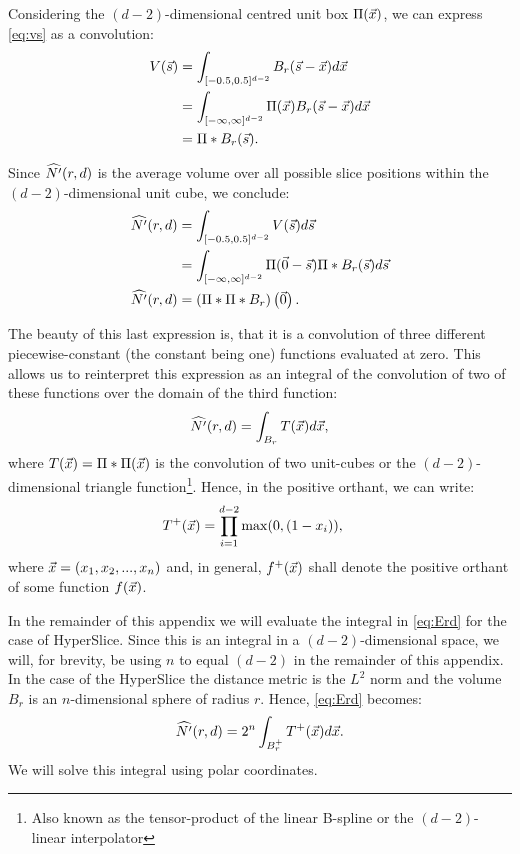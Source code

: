 Considering the $(d-2)$-dimensional centred unit box $\Pi(\vec{x})$, we can express \autoref{eq:vs} as a convolution:
\begin{align*}
  V(\vec{s}) &= \int_{[-0.5,0.5]^{d-2}} B_r(\vec{s}-\vec{x}) d\vec{x}\\
          &= \int_{[-\infty,\infty]^{d-2}} \Pi(\vec{x}) B_r(\vec{s}-\vec{x}) d\vec{x} \\
          &= \Pi * B_r(\vec{s}) \text{.}
\end{align*}

Since $\widehat{N'}(r, d)$ is the average volume over all possible slice positions within the $(d-2)$-dimensional unit cube, we conclude:
\begin{align*}
  \widehat{N'}(r, d) &= \int_{[-0.5,0.5]^{d-2}} V(\vec{s}) d\vec{s} \\
  	&= \int_{[-\infty,\infty]^{d-2}} \Pi(\vec{0}-\vec{s}) \Pi * B_r(\vec{s}) d\vec{s} \\
  \widehat{N'}(r, d) &= \left( \Pi * \Pi * B_r \right) \left(\vec{0}\right) \text{.}
\end{align*}

The beauty of this last expression is, that it is a convolution of three different piecewise-constant (the constant being one) functions evaluated at zero. This allows us to reinterpret this expression as an integral of the convolution of two of these functions over the domain of the third function:
\begin{equation}
  \widehat{N'}(r, d) = \int_{B_r} T(\vec{x}) d\vec{x} \text{,}
  \label{eq:Erd}
\end{equation}
where $T(\vec{x}) = \Pi * \Pi (\vec{x})$ is the convolution of two unit-cubes or the $(d-2)$-dimensional triangle function\footnote{Also known as the tensor-product of the linear B-spline or the $(d-2)$-linear interpolator}. Hence, in the positive orthant, we can write:
\begin{align*}
  T^{+}(\vec{x}) &= \prod_{i=1}^{d-2} \max(0,(1-x_i)) \text{,}
\end{align*}
where $\vec{x} = (x_1, x_2, ..., x_n)$ and, in general, $f^{+}(\vec{x})$ shall denote the positive orthant of some function $f(\vec{x})$.


In the remainder of this appendix we will evaluate the integral in \autoref{eq:Erd} for the case of HyperSlice. Since this is an integral in a $(d-2)$-dimensional space, we will, for brevity, be using $n$ to equal $(d-2)$ in the remainder of this appendix.
In the case of the HyperSlice the distance metric is the $L^2$ norm and the volume $B_r$ is an $n$-dimensional sphere of radius $r$. Hence, \autoref{eq:Erd} becomes:
\begin{equation}
  \widehat{N'}(r, d) = 2^n \int_{B^{+}_r} T^{+}(\vec{x}) d\vec{x} \text{.}
  \label{eq:ErdConvH}
\end{equation}
We will solve this integral using polar coordinates.

